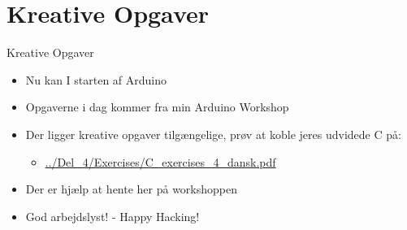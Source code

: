 \documentclass{beamer}
\begin{document}

\section{Kreative Opgaver}
\begin{frame}{Kreative Opgaver}
	\begin{itemize}
	\item{Nu kan I starten af Arduino}
	\item{Opgaverne i dag kommer fra min Arduino Workshop}
	\item{Der ligger kreative opgaver tilgængelige, prøv at koble jeres udvidede C på:}
		\begin{itemize}
		\item{\color{link}\href{https://github.com/Iakop/C-Programmering-for-begyndere/tree/master/Del_4/Exercises/C_exercises_4_dansk.pdf}{../Del\_4/Exercises/C\_exercises\_4\_dansk.pdf}}
		\end{itemize}
	\item{Der er hjælp at hente her på workshoppen}
	\item{God arbejdslyst! - Happy Hacking!}
	\end{itemize}
\end{frame}
\end{document}

